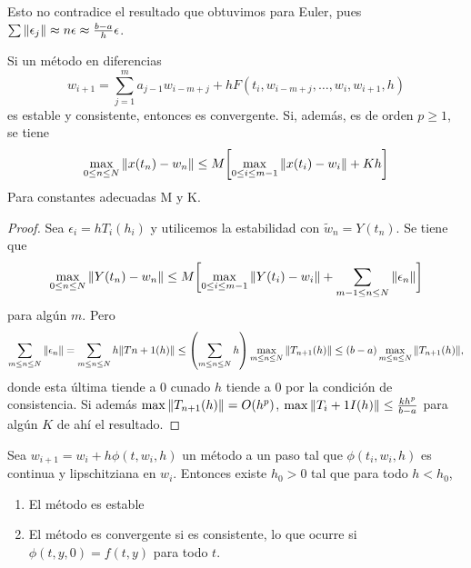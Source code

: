 \begin{remark}
    Esto no contradice el resultado que obtuvimos para Euler, pues
    $\sum\norm{\epsilon_j} \approx n\epsilon \approx \frac{b-a}{h}\epsilon$.
\end{remark}

\begin{theorem}
    Si un método en diferencias
    \begin{equation*}
        w_{i+1} = \sum_{j=1}^m {a_{j-1}w_{i-m+j}}
            + hF(t_i,w_{i-m+j}, \dots, w_i,w_{i+1},h)
    \end{equation*}
    es estable y consistente, entonces es convergente.
    Si, además, es de orden $p \geq 1$, se tiene
    \begin{equation*}
        \max_{0 \leq n \leq N}\norm{x(t_n) - w_n} \leq M\qty\bigg[
            \max_{0 \leq i \leq m-1} \norm{x(t_i) - w_i} + Kh
            ]
    \end{equation*}
    Para constantes adecuadas M y K.
\end{theorem}

\begin{proof}
    Sea $\epsilon_i = hT_i(h_i)$ y utilicemos la estabilidad
    con $\tilde{w}_n = Y(t_n)$. Se tiene que
    \begin{equation*}
        \max_{0 \leq n \leq N}\norm{Y(t_n) - w_n} \leq M\qty\bigg[
            \max_{0 \leq i \leq m-1}\norm{Y(t_i) - w_i}
            + \sum_{m-1\leq n \leq N}\norm{\epsilon_n}
        ]
    \end{equation*}
    para algún $m$. Pero
    \begin{equation*}
        \sum_{m \leq n \leq N} \norm{\epsilon_n} =
        \sum_{m \leq n \leq N} h\norm{Tn+1(h)} \leq
        \qty(\sum_{m \leq n \leq N} h)
            \max_{m \leq n \leq N}\norm{T_{n+1}(h)} \leq
        (b-a)\max_{m \leq n \leq N}\norm{T_{n+1}(h)},
    \end{equation*}
    donde esta última tiende a $0$ cunado $h$ tiende a $0$
    por la condición de consistencia.
    Si además $\max\norm{T_{n+1}(h)} = O(h^p)$,
    $\max\norm{T_i+1I(h)} \leq \frac{kh^p}{b-a}$ para algún $K$
    de ahí el resultado.
\end{proof}

\begin{theorem}
    Sea $w_{i+1} = w_i + h\phi(t, w_i, h)$ un método a un paso tal que
    $\phi(t_i, w_i, h)$ es continua y lipschitziana en $w_i$.
    Entonces existe $h_0 > 0$ tal que para todo $h < h_0$,
    \begin{enumerate}
        \item El método es estable
        \item El método es convergente si es consistente,
        lo que ocurre si $\phi(t, y, 0) = f(t, y)$ para todo $t$.
    \end{enumerate}
\end{theorem}

